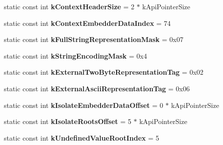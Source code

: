 \begin{DoxyCompactItemize}
\item 
\hypertarget{classv8_1_1internal_1_1_internals_aa5187d7653158ef851c53594e6e63851}{}static const int {\bfseries k\+Context\+Header\+Size} = 2 $\ast$ k\+Api\+Pointer\+Size\label{classv8_1_1internal_1_1_internals_aa5187d7653158ef851c53594e6e63851}

\item 
\hypertarget{classv8_1_1internal_1_1_internals_afb65846499ec5f68172e4b2e8301a493}{}static const int {\bfseries k\+Context\+Embedder\+Data\+Index} = 74\label{classv8_1_1internal_1_1_internals_afb65846499ec5f68172e4b2e8301a493}

\item 
\hypertarget{classv8_1_1internal_1_1_internals_a5c39a86b30463928ea719def66916507}{}static const int {\bfseries k\+Full\+String\+Representation\+Mask} = 0x07\label{classv8_1_1internal_1_1_internals_a5c39a86b30463928ea719def66916507}

\item 
\hypertarget{classv8_1_1internal_1_1_internals_a1927ac3def13a57e03025e62ca46d1c5}{}static const int {\bfseries k\+String\+Encoding\+Mask} = 0x4\label{classv8_1_1internal_1_1_internals_a1927ac3def13a57e03025e62ca46d1c5}

\item 
\hypertarget{classv8_1_1internal_1_1_internals_a73faf917416d2519b65c7255e77a74ce}{}static const int {\bfseries k\+External\+Two\+Byte\+Representation\+Tag} = 0x02\label{classv8_1_1internal_1_1_internals_a73faf917416d2519b65c7255e77a74ce}

\item 
\hypertarget{classv8_1_1internal_1_1_internals_adea2f5a76d07821f7fa885a8dcda0eec}{}static const int {\bfseries k\+External\+Ascii\+Representation\+Tag} = 0x06\label{classv8_1_1internal_1_1_internals_adea2f5a76d07821f7fa885a8dcda0eec}

\item 
\hypertarget{classv8_1_1internal_1_1_internals_ad722bf4760df09958cd1062db4a5524c}{}static const int {\bfseries k\+Isolate\+Embedder\+Data\+Offset} = 0 $\ast$ k\+Api\+Pointer\+Size\label{classv8_1_1internal_1_1_internals_ad722bf4760df09958cd1062db4a5524c}

\item 
\hypertarget{classv8_1_1internal_1_1_internals_a3142f942a25203ce7fca0e9a4563c74d}{}static const int {\bfseries k\+Isolate\+Roots\+Offset} = 5 $\ast$ k\+Api\+Pointer\+Size\label{classv8_1_1internal_1_1_internals_a3142f942a25203ce7fca0e9a4563c74d}

\item 
\hypertarget{classv8_1_1internal_1_1_internals_a7281ff0eafed559e64613465b1a03296}{}static const int {\bfseries k\+Undefined\+Value\+Root\+Index} = 5\label{classv8_1_1internal_1_1_internals_a7281ff0eafed559e64613465b1a03296}


\end{DoxyCompactItemize}

